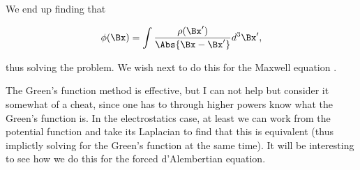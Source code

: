 We end up finding that 

\begin{equation}\label{eqn:relativisticElectrodynamicsL17b:390}
\phi(\Bx) = \int \frac{\rho(\Bx')}{\Abs{\Bx - \Bx'}} d^3 \Bx',
\end{equation}

thus solving the problem.  We wish next to do this for the Maxwell equation .

The Green's function method is effective, but I can not help but consider it somewhat of a cheat, since one has to through higher powers know what the Green's function is.  In the electrostatics case, at least we can work from the potential function and take its Laplacian to find that this is equivalent (thus implictly solving for the Green's function at the same time).  It will be interesting to see how we do this for the forced d'Alembertian equation.

